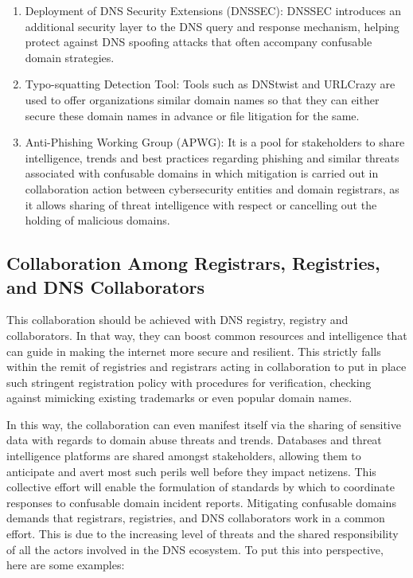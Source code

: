 \begin{enumerate}
  \item Deployment of DNS Security Extensions (DNSSEC): DNSSEC introduces an additional security layer to the DNS query and response mechanism, helping protect against DNS spoofing attacks that often accompany confusable domain strategies. 
  \item Typo-squatting Detection Tool: Tools such as DNStwist and URLCrazy are used to offer organizations similar domain names so that they can either secure these domain names in advance or file litigation for the same.
  \item Anti-Phishing Working Group (APWG): It is a pool for stakeholders to share intelligence, trends and best practices regarding phishing and similar threats associated with confusable domains in which mitigation is carried out in collaboration action between cybersecurity entities and domain registrars, as it allows sharing of threat intelligence with respect or cancelling out the holding of malicious domains.
\end{enumerate}

\subsection{Collaboration Among Registrars, Registries, and DNS Collaborators}

This collaboration should be achieved with DNS registry, registry and collaborators. In that way, they can boost common resources and intelligence that can guide in making the internet more secure and resilient. This strictly falls within the remit of registries and registrars acting in collaboration to put in place such stringent registration policy with procedures for verification, checking against mimicking existing trademarks or even popular domain names.

In this way, the collaboration can even manifest itself via the sharing of sensitive data with regards to domain abuse threats and trends. Databases and threat intelligence platforms are shared amongst stakeholders, allowing them to anticipate and avert most such perils well before they impact netizens. This collective effort will enable the formulation of standards by which to coordinate responses to confusable domain incident reports. Mitigating confusable domains demands that registrars, registries, and DNS collaborators work in a common effort. This is due to the increasing level of threats and the shared responsibility of all the actors involved in the DNS ecosystem. \cite{Catania2022} To put this into perspective, here are some examples: 


